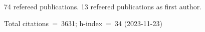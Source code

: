 74 refereed publications. 13 refeered publications as first author.

Total citations~=~3631; h-index~=~34 (2023-11-23)